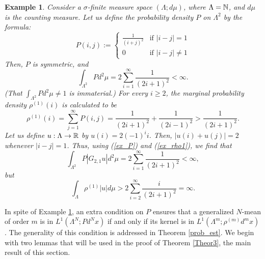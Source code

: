 \documentclass[12pt,leqno]{amsart}
\newtheorem{exam}{Example}[section]{\bf}{\rm}
\numberwithin{equation}{section}
\numberwithin{theor}{section}
\numberwithin{rem}{section}
\begin{document}
\begin{exam}
\label{Exam_int}
\rm{
Consider a $\sigma$-finite measure space $(\Lambda; d\mu)$, where $\Lambda=\Bbb{N}$, and $d\mu$ is the counting measure.  Let us define the probability density $P$ on 
$\Lambda^2$ by the formula:
\begin{equation}
\label{ex_P}
P(i,j):=\left \{
\begin{array}{ll}
\frac{1}{(i+j)^2}&\text{if $|i-j|=1$}\\
0&\text{if $|i-j|\neq1$}
\end{array}
\right .
\end{equation}
Then, $P$ is symmetric, and 
\begin{equation}
\int_{\Lambda^2} P d^{2}\mu = 2 \sum_{i=1}^{\infty} 
\frac{1}{(2i+1)^2}<\infty.
\end{equation}
(That $\int_{\Lambda^2} P d^{2}\mu\neq 1$ is immaterial.)  
For every $i\geq 2$, the marginal probability density 
$\rho^{(1)}(i)$ is calculated to be 
\begin{equation}
\label{ex_rho1}
\rho^{(1)}(i)=\sum_{j=1}^{\infty} P(i,j)=
\frac{1}{(2i+1)^2}+\frac{1}{(2i-1)^2}>\frac{1}{(2i+1)^2}.
\end{equation}
Let us define $u:\Lambda\rightarrow \Bbb{R}$ by 
$u(i)=2(-1)^{i}i$.  Then, $|u(i)+u(j)|=2$ whenever 
$|i-j|=1$.  Thus, using (\ref{ex_P}) and (\ref{ex_rho1}), we find that
\begin{equation}
\int_{\Lambda^2} P |G_{2,1} u |d^{2}\mu = 
2 \sum_{i=1}^{\infty} \frac{1}{(2i+1)^2}<\infty, 
\end{equation}
but
\begin{equation}
\int_{\Lambda}\rho^{(1)}|u| d\mu>2\sum_{i=2}^{\infty}
 \frac{i}{(2i+1)^2}=\infty.
\end{equation} 
 }
\end{exam} 
In spite of Example \ref{Exam_int}, an extra condition on $P$ ensures that a generalized $N$-mean of order $m$ is in 
$L^{1}(\Lambda^{N};Pd^{N}x)$ if and only if its kernel is in 
$L^{1}(\Lambda^{m};\rho^{(m)}d^{m}x)$.  The generality of 
this condition is addressed in Theorem \ref{prob_est}.  
We begin with two lemmas that will be used in the proof of 
Theorem \ref{Theor3}, the main result of this section.    
\end{document}
